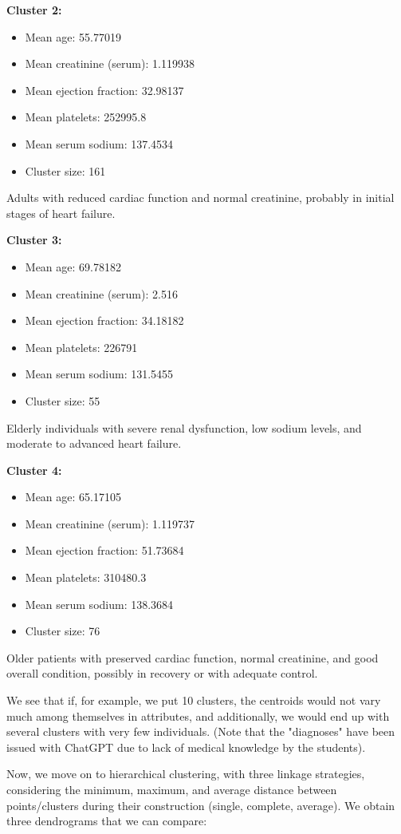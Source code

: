 \documentclass[11pt,a4paper]{article}
\begin{document}
\textbf{Cluster 2:}
\begin{itemize}
    \item Mean age: 55.77019
    \item Mean creatinine (serum): 1.119938
    \item Mean ejection fraction: 32.98137
    \item Mean platelets: 252995.8
    \item Mean serum sodium: 137.4534
    \item Cluster size: 161
\end{itemize}
Adults with reduced cardiac function and normal creatinine, probably in initial stages of heart failure.

\textbf{Cluster 3:}
\begin{itemize}
    \item Mean age: 69.78182
    \item Mean creatinine (serum): 2.516
    \item Mean ejection fraction: 34.18182
    \item Mean platelets: 226791
    \item Mean serum sodium: 131.5455
    \item Cluster size: 55
\end{itemize}
Elderly individuals with severe renal dysfunction, low sodium levels, and moderate to advanced heart failure.

\textbf{Cluster 4:}
\begin{itemize}
    \item Mean age: 65.17105
    \item Mean creatinine (serum): 1.119737
    \item Mean ejection fraction: 51.73684
    \item Mean platelets: 310480.3
    \item Mean serum sodium: 138.3684
    \item Cluster size: 76
\end{itemize}
Older patients with preserved cardiac function, normal creatinine, and good overall condition, possibly in recovery or with adequate control.

We see that if, for example, we put 10 clusters, the centroids would not vary much among themselves in attributes, and additionally, we would end up with several clusters with very few individuals.
(Note that the "diagnoses" have been issued with ChatGPT due to lack of medical knowledge by the students).

Now, we move on to hierarchical clustering, with three linkage strategies, considering the minimum, maximum, and average distance between points/clusters during their construction (single, complete, average). We obtain three dendrograms that we can compare:
\end{document}
